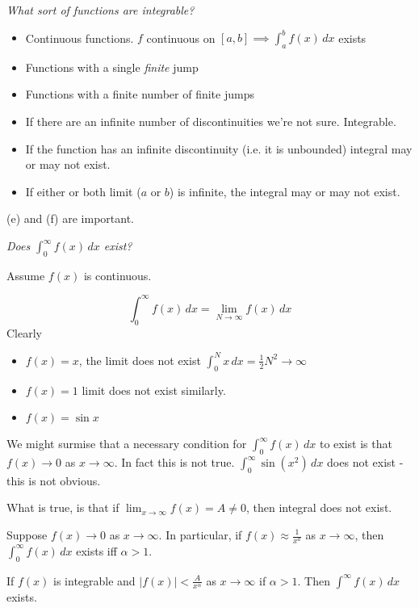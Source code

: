 \documentclass[twoside]{scrartcl}
\begin{document}
\emph{What sort of functions are integrable?} 

\begin{itemize}
  \item[(a)] Continuous functions. $f$ continuous on $[a,b] \implies \int_a^b f(x)\, dx$ exists
  \item[(b)] Functions with a single \emph{finite} jump
  \item[(c)] Functions with a finite number of finite jumps
  \item[(d)] If there are an infinite number of discontinuities we're not sure. Integrable.
  \item[(e)] If the function has an infinite discontinuity (i.e. it is unbounded) integral may or may not exist.
  \item[(f)] If either or both limit ($a$ or $b$) is infinite, the integral may or may not exist. 
\end{itemize}

(e) and (f) are important. 


\emph{Does $\int_0^{\infty} f(x)\,dx$ exist?} 

Assume $f(x)$ is continuous. 

\[\int_0^{\infty} f(x)\,dx = \lim_{N \to \infty} f(x)\,dx\]
Clearly 
\begin{itemize}
  \item[(a)] $f(x) = x$, the limit does not exist $\int_0^N x\,dx = \frac{1}{2}N^2 \to \infty$
  \item[(b)] $f(x) = 1$ limit does not exist similarly.
 \item[(c)] $f(x) = \sin x$ 
\end{itemize}\vspace*{5pt}

We might surmise that a necessary condition for $\int_0^{\infty} f(x)\,dx$ to exist is that $f(x) \to 0$ as $x \to \infty$. In fact this is not true. $\int_0^{\infty} \sin(x^2)\,dx$ does not exist - this is not obvious. 

What is true, is that if $\lim_{x \to \infty} f(x) = A \neq 0$, then integral does not exist. 

Suppose $f(x) \to 0$ as $x \to \infty$. In particular, if $f(x) \approx \frac{1}{x^a}$ as $x \to \infty$, then $\int_0^{\infty} f(x)\, dx$ exists iff $\alpha > 1$.\\

\begin{theorem} If $f(x)$ is integrable and $|f(x)| < \frac{A}{x^{\alpha}}$ as $x \to \infty$ if $\alpha > 1$. Then $\int^{\infty} f(x)\, dx$ exists. 
\end{theorem}
\end{document}
